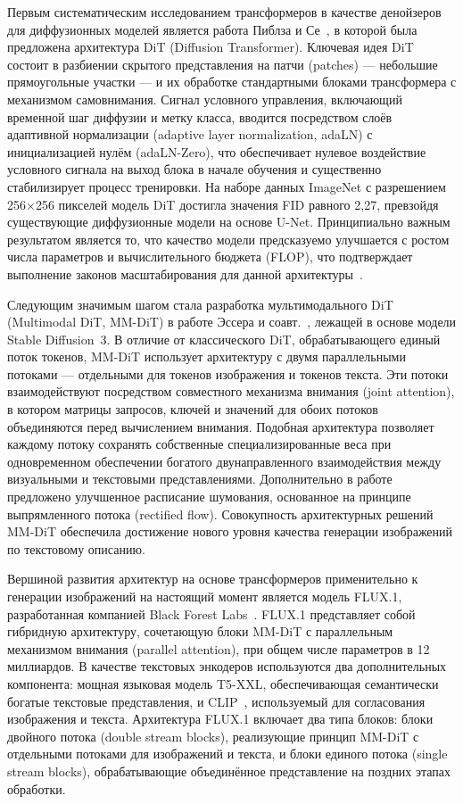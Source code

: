 Первым систематическим исследованием трансформеров в качестве денойзеров для диффузионных моделей является работа Пиблза и Се~\cite{peebles2023dit}, в которой была предложена архитектура DiT (Diffusion Transformer). Ключевая идея DiT состоит в разбиении скрытого представления на патчи (patches) --- небольшие прямоугольные участки --- и их обработке стандартными блоками трансформера с механизмом самовнимания. Сигнал условного управления, включающий временной шаг диффузии и метку класса, вводится посредством слоёв адаптивной нормализации (adaptive layer normalization, adaLN) с инициализацией нулём (adaLN-Zero), что обеспечивает нулевое воздействие условного сигнала на выход блока в начале обучения и существенно стабилизирует процесс тренировки. На наборе данных ImageNet с разрешением 256×256 пикселей модель DiT достигла значения FID равного 2,27, превзойдя существующие диффузионные модели на основе U-Net. Принципиально важным результатом является то, что качество модели предсказуемо улучшается с ростом числа параметров и вычислительного бюджета (FLOP), что подтверждает выполнение законов масштабирования для данной архитектуры~\cite{peebles2023dit}.

Следующим значимым шагом стала разработка мультимодального DiT (Multimodal DiT, MM-DiT) в работе Эссера и соавт.~\cite{esser2024sd3}, лежащей в основе модели Stable Diffusion~3. В отличие от классического DiT, обрабатывающего единый поток токенов, MM-DiT использует архитектуру с двумя параллельными потоками --- отдельными для токенов изображения и токенов текста. Эти потоки взаимодействуют посредством совместного механизма внимания (joint attention), в котором матрицы запросов, ключей и значений для обоих потоков объединяются перед вычислением внимания. Подобная архитектура позволяет каждому потоку сохранять собственные специализированные веса при одновременном обеспечении богатого двунаправленного взаимодействия между визуальными и текстовыми представлениями. Дополнительно в работе~\cite{esser2024sd3} предложено улучшенное расписание шумования, основанное на принципе выпрямленного потока (rectified flow). Совокупность архитектурных решений MM-DiT обеспечила достижение нового уровня качества генерации изображений по текстовому описанию.

Вершиной развития архитектур на основе трансформеров применительно к генерации изображений на настоящий момент является модель FLUX.1, разработанная компанией Black Forest Labs~\cite{blackforest2024flux}. FLUX.1 представляет собой гибридную архитектуру, сочетающую блоки MM-DiT с параллельным механизмом внимания (parallel attention), при общем числе параметров в 12 миллиардов. В качестве текстовых энкодеров используются два дополнительных компонента: мощная языковая модель T5-XXL, обеспечивающая семантически богатые текстовые представления, и CLIP~\cite{radford2021clip}, используемый для согласования изображения и текста. Архитектура FLUX.1 включает два типа блоков: блоки двойного потока (double stream blocks), реализующие принцип MM-DiT с отдельными потоками для изображений и текста, и блоки единого потока (single stream blocks), обрабатывающие объединённое представление на поздних этапах обработки.

